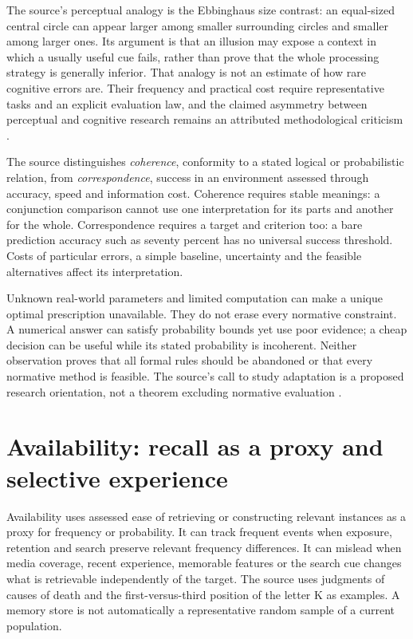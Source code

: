 The source's perceptual analogy is the Ebbinghaus size contrast:
an equal-sized central circle can appear larger among smaller surrounding
circles and smaller among larger ones. Its argument is that an illusion
may expose a context in which a usually useful cue fails, rather than
prove that the whole processing strategy is generally inferior. That
analogy is not an estimate of how rare cognitive errors are. Their
frequency and practical cost require representative tasks and an
explicit evaluation law, and the claimed asymmetry between perceptual
and cognitive research remains an attributed methodological criticism
\cite[pp.~162,168, notes~1--2]{FiedlerPragerMcCaughey2021Heuristics}.

The source distinguishes \emph{coherence}, conformity to a stated
logical or probabilistic relation, from \emph{correspondence}, success
in an environment assessed through accuracy, speed and information cost.
Coherence requires stable meanings: a conjunction comparison cannot use
one interpretation for its parts and another for the whole.
Correspondence requires a target and criterion too: a bare prediction
accuracy such as seventy percent has no universal success threshold.
Costs of particular errors, a simple baseline, uncertainty and the
feasible alternatives affect its interpretation.

Unknown real-world parameters and limited computation can make a unique
optimal prescription unavailable. They do not erase every normative
constraint. A numerical answer can satisfy probability bounds yet use
poor evidence; a cheap decision can be useful while its stated
probability is incoherent. Neither observation proves that all formal
rules should be abandoned or that every normative method is feasible.
The source's call to study adaptation is a proposed research orientation,
not a theorem excluding normative evaluation
\cite[pp.~165--168]{FiedlerPragerMcCaughey2021Heuristics}.

\section{Availability: recall as a proxy and selective experience}
\label{sec:p19-r24-availability}

Availability uses assessed ease of retrieving or constructing relevant instances as a proxy for
frequency or probability. It can track frequent events when exposure,
retention and search preserve relevant frequency differences. It can
mislead when media coverage, recent experience, memorable features or
the search cue changes what is retrievable independently of the target.
The source uses judgments of causes of death and the first-versus-third
position of the letter K as examples. A memory store is not automatically
a representative random sample of a current population.

